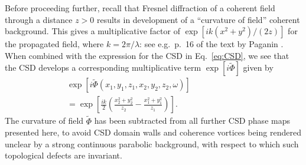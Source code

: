\documentclass[%
 reprint,
 amsmath,amssymb,
 aps,
]{revtex4-1}
\begin{document}
Before proceeding further, recall that Fresnel diffraction of a coherent field through a distance $z>0$ results in development of a ``curvature of field'' coherent background.  This  gives a multiplicative factor of $\exp[ik(x^2+y^2)/(2z)]$ for the propagated field, where $k=2\pi/\lambda$: see e.g.~p.~16 of the text by Paganin \cite{paganin_book}.  When combined with the expression for the CSD in Eq.~\ref{eq:CSD}, we see that the CSD develops a corresponding multiplicative term $\exp[i\tilde{\Phi}]$ given by
%
\begin{eqnarray}
\nonumber\exp[i\tilde{\Phi}(x_1,y_1,z_1,x_2,y_2,z_2,\omega)] \quad\quad\quad\quad\quad\quad \\ =\exp\left[\frac{ik}{2}\left(\frac{x_2^2+y_2^2}{z_2}-\frac{x_1^2+y_1^2}{z_1}\right)\right].    
\label{eq:CSD-curvature-of-field}
\end{eqnarray}
%
The curvature of field $\tilde{\Phi}$ has been subtracted from all further CSD phase maps presented here, to avoid CSD domain walls and coherence vortices being rendered unclear by a strong continuous parabolic background, with respect to which such topological defects are invariant.  
\end{document}

